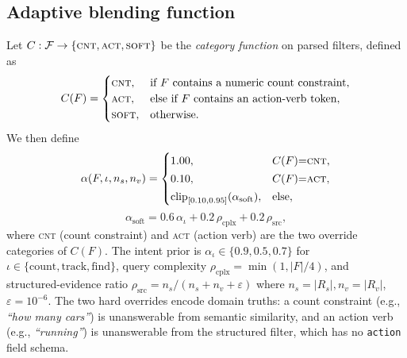 ﻿\documentclass[conference]{IEEEtran}
\theoremstyle{definition}
\begin{document}
\subsection{Adaptive blending function}
Let $C:\mathcal{F}\to\{\textsc{cnt},\textsc{act},\textsc{soft}\}$ be the \emph{category function} on parsed filters, defined as
\begin{equation}
C(F) = \begin{cases}
\textsc{cnt}, & \text{if } F \text{ contains a numeric count constraint},\\
\textsc{act}, & \text{else if } F \text{ contains an action-verb token},\\
\textsc{soft}, & \text{otherwise}.
\end{cases}
\label{eq:category}
\end{equation}
We then define
\begin{equation}
\alpha(F,\iota,n_s,n_v) =
\begin{cases}
1.00, & C(F){=}\textsc{cnt}, \\[2pt]
0.10, & C(F){=}\textsc{act}, \\[2pt]
\mathrm{clip}_{[0.10,0.95]}(\alpha_{\text{soft}}), & \text{else},
\end{cases}
\label{eq:adaptive_alpha}
\end{equation}
\begin{equation}
\alpha_{\text{soft}} = 0.6\,\alpha_\iota + 0.2\,\rho_{\text{cplx}} + 0.2\,\rho_{\text{src}},
\label{eq:alpha_soft}
\end{equation}
where \textsc{cnt} (count constraint) and \textsc{act} (action verb) are the two override categories of $C(F)$. The intent prior is $\alpha_\iota \in \{0.9, 0.5, 0.7\}$ for $\iota\in\{\text{count}, \text{track}, \text{find}\}$, query complexity $\rho_{\text{cplx}}=\min(1,|F|/4)$, and structured-evidence ratio $\rho_{\text{src}}=n_s/(n_s+n_v+\varepsilon)$ where $n_s=|R_s|, n_v=|R_v|$, $\varepsilon=10^{-6}$. The two hard overrides encode domain truths: a count constraint (e.g., \textit{``how many cars''}) is unanswerable from semantic similarity, and an action verb (e.g., \textit{``running''}) is unanswerable from the structured filter, which has no \texttt{action} field schema.
\end{document}

